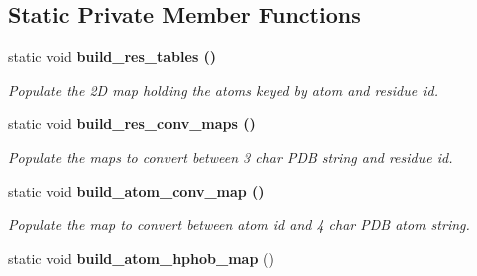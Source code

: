 \subsection*{Static Private Member Functions}
\begin{CompactItemize}
\item 
static void \bf{build\_\-res\_\-tables} ()\label{classSimSite3D_1_1PDB__residues_0bb938a071dfd70c2620ca490bc761cb}

\begin{CompactList}\small\item\em Populate the 2D map holding the atoms keyed by atom and residue id. \item\end{CompactList}\item 
static void \bf{build\_\-res\_\-conv\_\-maps} ()\label{classSimSite3D_1_1PDB__residues_cebf2dfefa17acc3f1d43defd1ac7197}

\begin{CompactList}\small\item\em Populate the maps to convert between 3 char PDB string and residue id. \item\end{CompactList}\item 
static void \bf{build\_\-atom\_\-conv\_\-map} ()\label{classSimSite3D_1_1PDB__residues_d644f1a2ffd15ffc31eb06f9de21a4b2}

\begin{CompactList}\small\item\em Populate the map to convert between atom id and 4 char PDB atom string. \item\end{CompactList}\item 
static void \textbf{build\_\-atom\_\-hphob\_\-map} ()\label{classSimSite3D_1_1PDB__residues_998bba4236cd420ca3450d4a86318a4a}

\end{CompactItemize}
